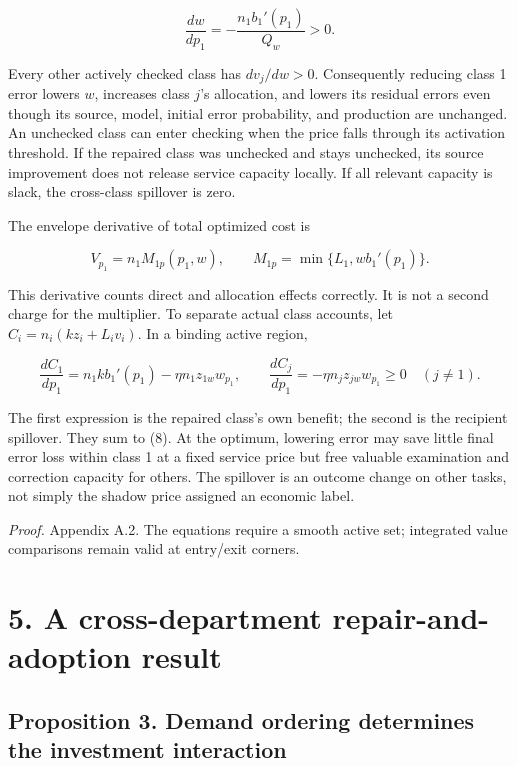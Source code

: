 \documentclass[
  11pt,
  a4paper,
]{article}
\begin{document}
\[\frac{dw}{dp_1}=-\frac{n_1 b_1'(p_1)}{Q_w}>0. \tag{7}\]

Every other actively checked class has \(dv_j/dw>0\). Consequently
reducing class 1 error lowers \(w\), increases class \(j\)'s allocation,
and lowers its residual errors even though its source, model, initial
error probability, and production are unchanged. An unchecked class can
enter checking when the price falls through its activation threshold. If
the repaired class was unchecked and stays unchecked, its source
improvement does not release service capacity locally. If all relevant
capacity is slack, the cross-class spillover is zero.

The envelope derivative of total optimized cost is

\[V_{p_1}=n_1 M_{1p}(p_1,w),\qquad
M_{1p}=\min\{L_1,w b_1'(p_1)\}. \tag{8}\]

This derivative counts direct and allocation effects correctly. It is
not a second charge for the multiplier. To separate actual class
accounts, let \(C_i=n_i(kz_i+L_i v_i)\). In a binding active region,

\[\frac{dC_1}{dp_1}=n_1k b_1'(p_1)-\eta n_1 z_{1w}w_{p_1},
\qquad
\frac{dC_j}{dp_1}=-\eta n_j z_{jw}w_{p_1}\geq0\quad(j\ne1). \tag{9}\]

The first expression is the repaired class's own benefit; the second is
the recipient spillover. They sum to (8). At the optimum, lowering error
may save little final error loss within class 1 at a fixed service price
but free valuable examination and correction capacity for others. The
spillover is an outcome change on other tasks, not simply the shadow
price assigned an economic label.

\emph{Proof.} Appendix A.2. The equations require a smooth active set;
integrated value comparisons remain valid at entry/exit corners.

\hypertarget{a-cross-department-repair-and-adoption-result}{%
\section{5. A cross-department repair-and-adoption
result}\label{a-cross-department-repair-and-adoption-result}}

\hypertarget{proposition-3.-demand-ordering-determines-the-investment-interaction}{%
\subsection{Proposition 3. Demand ordering determines the investment
interaction}\label{proposition-3.-demand-ordering-determines-the-investment-interaction}}
\end{document}
